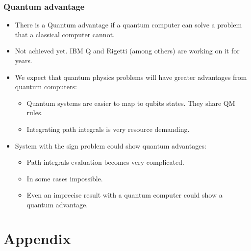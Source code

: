 \documentclass[10pt,t,xcolor=dvipsnames,aspectratio=169]{beamer}
\newlength\leftsidebar
\begin{document}
\begin{frame}
    \frametitle{Quantum advantage}
    \begin{itemize}
        \item
            There is a Quantum advantage if a quantum computer can solve a problem that a classical computer cannot.
        \item
            Not achieved yet. IBM Q and Rigetti (among others) are working on it for years.
        \item
            We expect that quantum physics problems will have greater advantages from quantum computers:
            \begin{itemize}
                \item Quantum systems are easier to map to qubits states. They share QM rules.
                \item Integrating path integrals is very resource demanding.
            \end{itemize}
        \item
            System with the sign problem could show quantum advantages:
            \begin{itemize}
                \item Path integrals evaluation becomes very complicated.
                \item In some cases impossible.
                \item Even an imprecise result with a quantum computer could show a quantum advantage.
            \end{itemize}
    \end{itemize}
\end{frame}

\leftsidebar
{
\begin{frame}[plain,t]
\titlepage
\end{frame}
}
\hoffset=0in %

\section{Appendix}
\end{document}

